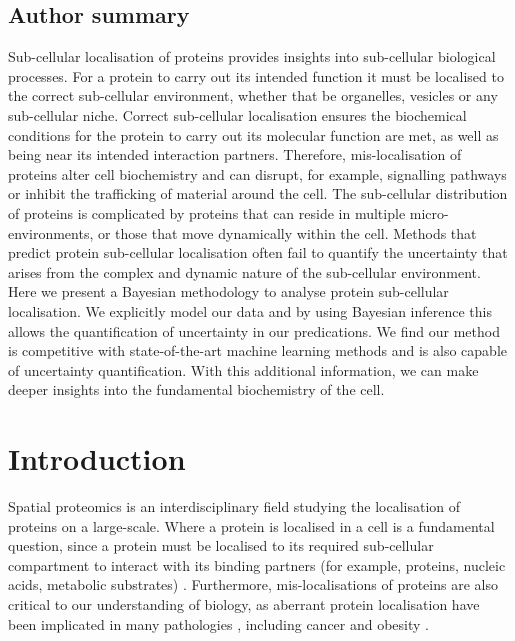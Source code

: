 \documentclass[12pt,english]{article}\usepackage[]{graphicx}\usepackage[]{color}
\begin{document}
\subsection*{Author summary}

Sub-cellular localisation of proteins provides insights into
sub-cellular biological processes. For a protein to carry out its
intended function it must be localised to the correct sub-cellular
environment, whether that be organelles, vesicles or any sub-cellular
niche. Correct sub-cellular localisation ensures the biochemical
conditions for the protein to carry out its molecular function are
met, as well as being near its intended interaction
partners. Therefore, mis-localisation of proteins alter cell
biochemistry and can disrupt, for example, signalling pathways or
inhibit the trafficking of material around the cell. The sub-cellular
distribution of proteins is complicated by proteins that can reside in
multiple micro-environments, or those that move dynamically within the
cell. Methods that predict protein sub-cellular localisation often
fail to quantify the uncertainty that arises from the complex and
dynamic nature of the sub-cellular environment. Here we present a
Bayesian methodology to analyse protein sub-cellular localisation. We
explicitly model our data and by using Bayesian inference this allows
the quantification of uncertainty in our predications. We find our
method is competitive with state-of-the-art machine learning methods
and is also capable of uncertainty quantification. With this
additional information, we can make deeper insights into the
fundamental biochemistry of the cell.



\section{Introduction}\label{Intro}

Spatial proteomics is an interdisciplinary field studying the
localisation of proteins on a large-scale. Where a protein is
localised in a cell is a fundamental question, since a protein must be
localised to its required sub-cellular compartment to interact with
its binding partners (for example, proteins, nucleic acids, metabolic
substrates) \citep{Gibson:2009}. Furthermore, mis-localisations of
proteins are also critical to our understanding of biology, as
aberrant protein localisation have been implicated in many pathologies
\citep{Olkkonen:2006, Laurila:2009, Luheshi:2008, De:2011, Cody:2013},
including cancer \citep{Kau:2004, Rodriguez:2004, Latorre:2005,
  Shin:2013} and obesity \citep{Siljee:2018}.
\end{document}
